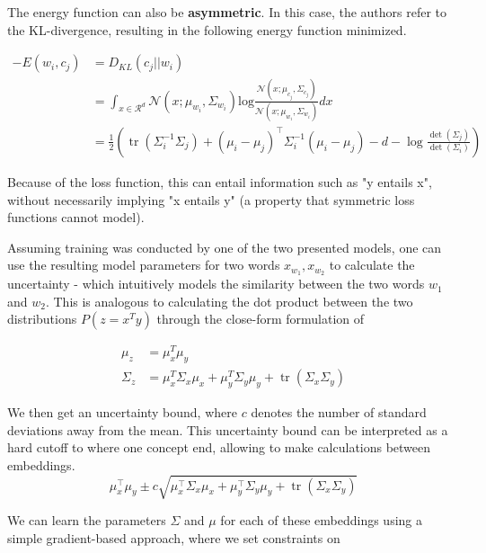\documentclass[a4paper,12pt,twoside,openright]{report}
\begin{document}
The energy function can also be \textbf{asymmetric}.
In this case, the authors refer to the KL-divergence, resulting in the following energy function minimized.

\begin{align}
-E(w_i, c_j) & = D_{KL}(c_j || w_i) \\
&= \int_{x \in \mathcal{R}^d} \mathcal{N}(x; \mu_{w_i}, \Sigma_{w_i}) \text{log} \frac{\mathcal{N}(x; \mu_{c_j}, \Sigma_{c_j})}{\mathcal{N}(x; \mu_{w_i}, \Sigma_{w_i})} dx \\
&= \frac{1}{2}\left(\operatorname{tr}\left(\Sigma_{i}^{-1} \Sigma_{j}\right)+\left(\mu_{i}-\mu_{j}\right)^{\top} \Sigma_{i}^{-1}\left(\mu_{i}-\mu_{j}\right)-d-\log \frac{\operatorname{det}\left(\Sigma_{j}\right)}{\operatorname{det}\left(\Sigma_{i}\right)}\right)
\end{align}

Because of the loss function, this can entail information such as "y entails x", without necessarily implying "x entails y" (a property that symmetric loss functions cannot model).

Assuming training was conducted by one of the two presented models,  one can use the resulting model parameters for two words $x_{w_1}, x_{w_2}$ to calculate the uncertainty - which intuitively models the similarity between the two words $w_1$ and $w_2$.
This is analogous to calculating the dot product between the two distributions $P(z=x^T y)$ through the close-form formulation of

\begin{align}
\mu_z &= \mu_x^T \mu_y \\
\Sigma_z &= \mu_{x}^T \Sigma_{x} \mu_{x}+\mu_{y}^T \Sigma_{y} \mu_{y}+\operatorname{tr}\left(\Sigma_{x} \Sigma_{y}\right)
\end{align}

We then get an uncertainty bound, where $c$ denotes the number of standard deviations away from the mean.
This uncertainty bound can be interpreted as a hard cutoff to where one concept end, allowing to make calculations between embeddings.
\begin{equation}
\mu_{x}^{\top} \mu_{y} \pm c \sqrt{\mu_{x}^{\top} \Sigma_{x} \mu_{x}+\mu_{y}^{\top} \Sigma_{y} \mu_{y}+\operatorname{tr}\left(\Sigma_{x} \Sigma_{y}\right)}
\end{equation}

We can learn the parameters $\Sigma$ and $\mu$ for each of these embeddings using a simple gradient-based approach, where we set constraints on 
\end{document}
